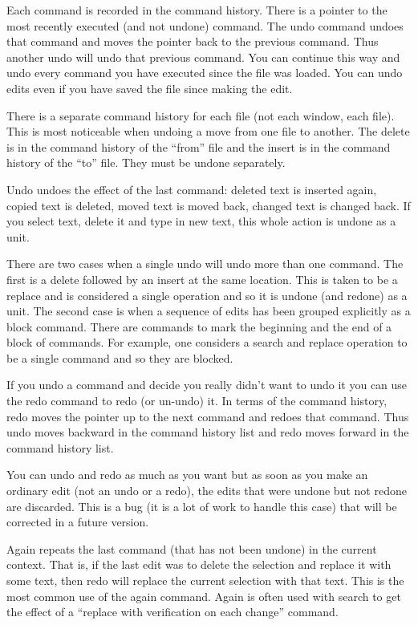 Each command is recorded in the command history.
There is a pointer to the most recently executed
(and not undone) command.
The undo command undoes that command and moves the
pointer back to the previous command.
Thus another undo will undo that previous command.
You can continue this way and undo every command you have
executed since the file was loaded.
You can undo edits even if you have saved the file since making
the edit.

There is a separate command history for each file
(not each window, each file).
This is most noticeable when undoing a move from one file to another.
The delete is in the command history of the ``from'' file and the
insert is in the command history of the ``to'' file.
They must be undone separately.

Undo undoes the effect of the last command:
deleted text is inserted again,
copied text is deleted,
moved text is moved back,
changed text is changed back.
If you select text, delete it and type in new text,
this whole action is undone as a unit.

There are two cases when a single undo will undo more than
one command.
The first is a delete followed by an insert at the same location.
This is taken to be a replace and is considered a single operation
and so it is undone (and redone) as a unit.
The second case is when a sequence of edits has been grouped
explicitly as a block command.
There are commands to mark the beginning and the end of a block
of commands.
For example, one considers a search and replace operation to be
a single command and so they are blocked.

If you undo a command and decide you really didn't want
to undo it you can use the redo command to redo (or un-undo) it.
In terms of the command history,
redo moves the pointer up to the next command and redoes that
command.
Thus undo moves backward in the command history list and
redo moves forward in the command history list.

You can undo and redo as much as you want but as soon as you
make an ordinary edit (not an undo or a redo),
the edits that were undone but not redone are discarded.
This is a bug (it is a lot of work to handle this case)
that will be corrected in a future version.

Again repeats the last command (that has not been undone)
in the current context.
That is, if the last edit was to delete the selection and
replace it with some text, then redo will replace
the current selection with that text.
This is the most common use of the again command.
Again is often used with search to get the effect of a
``replace with verification on each change'' command.

